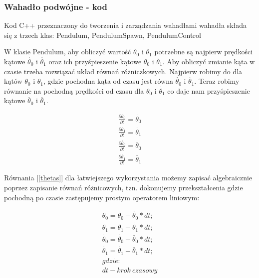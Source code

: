 \documentclass[a4paper,12pt,reqno]{article}
\begin{document}
\subsubsection{Wahadło podwójne - kod}


Kod C++ przeznaczony do tworzenia i zarządzania wahadłami wahadła składa się z trzech klas: Pendulum, PendulumSpawn, PendulumControl

W klasie Pendulum, aby obliczyć wartość $\theta_0$ i $\theta_1$ potrzebne są najpierw prędkości kątowe  $\dot{\theta_0}$ i $\dot{\theta_1}$ oraz ich przyśpieszenie kątowe $\ddot{\theta_0}$ i $\ddot{\theta_1}$. Aby obliczyć zmianie kąta w czasie trzeba rozwiązać układ równań różniczkowych. Najpierw robimy do dla kątów  $\theta_0$ i $\theta_1$, gdzie pochodna kąta od czasu jest równa $\dot{\theta_0}$ i $\dot{\theta_1}$. Teraz robimy równanie na pochodną prędkości od czasu dla $\dot{\theta_0}$ i $\dot{\theta_1}$ co daje nam przyśpieszenie kątowe $\ddot{\theta_0}$ i $\ddot{\theta_1}$.

\begin{equation}
\begin{split} 
\frac{\partial\theta_0}{\partial t}=\dot{\theta_0}
\\
\frac{\partial\theta_1}{\partial t}=\dot{\theta_1}
\\
\frac{\partial\dot{\theta_0}}{\partial t}=\ddot{\theta_0}
\\
\frac{\partial\dot{\theta_1}}{\partial t}=\ddot{\theta_1}
\end{split}
\label{thetas}
\end{equation}

Równania [\ref{thetas}] dla łatwiejszego wykorzystania możemy zapisać algebraicznie poprzez zapisanie równań różnicowych, tzn. dokonujemy przekształcenia gdzie pochodną po czasie zastępujemy prostym operatorem liniowym:

\begin{equation}
\begin{split} 
\theta_0=\theta_0+\dot{\theta_0}*dt;
\\
\theta_1=\theta_1+\dot{\theta_1}*dt;
\\
\dot{\theta_0}=\dot{\theta_0}+\ddot{\theta_0}*dt;
\\
\dot{\theta_1}=\dot{\theta_1}+\ddot{\theta_1}*dt;
\\
gdzie:
\\
dt-krok\ czasowy
\end{split}
\label{pendumalgeb}
\end{equation}
\end{document}
